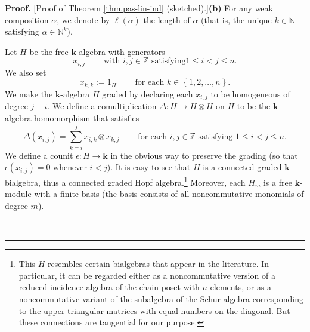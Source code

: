 \documentclass[numbers=enddot,12pt,final,onecolumn,notitlepage]{scrartcl}%
\theoremstyle{definition}
\newenvironment{proof}[1][Proof]{\noindent\textbf{#1.} }{\ \rule{0.5em}{0.5em}}
\let\sumnonlimits\sum
\renewcommand{\sum}{\sumnonlimits\limits}
\begin{document}
\begin{proof}
[Proof of Theorem \ref{thm.pas-lin-ind} (sketched).]\textbf{(b)} For any weak
composition $\alpha$, we denote by $\ell\left(  \alpha\right)  $ the length of
$\alpha$ (that is, the unique $k\in\mathbb{N}$ satisfying $\alpha\in
\mathbb{N}^{k}$).

Let $H$ be the free $\mathbf{k}$-algebra with generators
\[
x_{i,j}\ \ \ \ \ \ \ \ \ \ \text{with }i,j\in\mathbb{Z}\text{ satisfying
}1\leq i<j\leq n.
\]
We also set%
\[
x_{k,k}:=1_{H}\ \ \ \ \ \ \ \ \ \ \text{for each }k\in\left\{  1,2,\ldots
,n\right\}  .
\]
We make the $\mathbf{k}$-algebra $H$ graded by declaring each $x_{i,j}$ to be
homogeneous of degree $j-i$. We define a comultiplication $\Delta:H\rightarrow
H\otimes H$ on $H$ to be the $\mathbf{k}$-algebra homomorphism that satisfies%
\[
\Delta\left(  x_{i,j}\right)  =\sum_{k=i}^{j}x_{i,k}\otimes x_{k,j}%
\ \ \ \ \ \ \ \ \ \ \text{for each }i,j\in\mathbb{Z}\text{ satisfying }1\leq
i<j\leq n.
\]
We define a counit $\epsilon:H\rightarrow\mathbf{k}$ in the obvious way to
preserve the grading (so that $\epsilon\left(  x_{i,j}\right)  =0$ whenever
$i<j$). It is easy to see that $H$ is a connected graded $\mathbf{k}%
$-bialgebra, thus a connected graded Hopf algebra.\footnote{This $H$ resembles
certain bialgebras that appear in the literature. In particular, it can be
regarded either as a noncommutative version of a reduced incidence algebra of
the chain poset with $n$ elements, or as a noncommutative variant of the
subalgebra of the Schur algebra corresponding to the upper-triangular matrices
with equal numbers on the diagonal. But these connections are tangential for
our purpose.} Moreover, each $H_{m}$ is a free $\mathbf{k}$-module with a
finite basis (the basis consists of all noncommutative monomials of degree $m$).


\end{proof}
\end{document}
